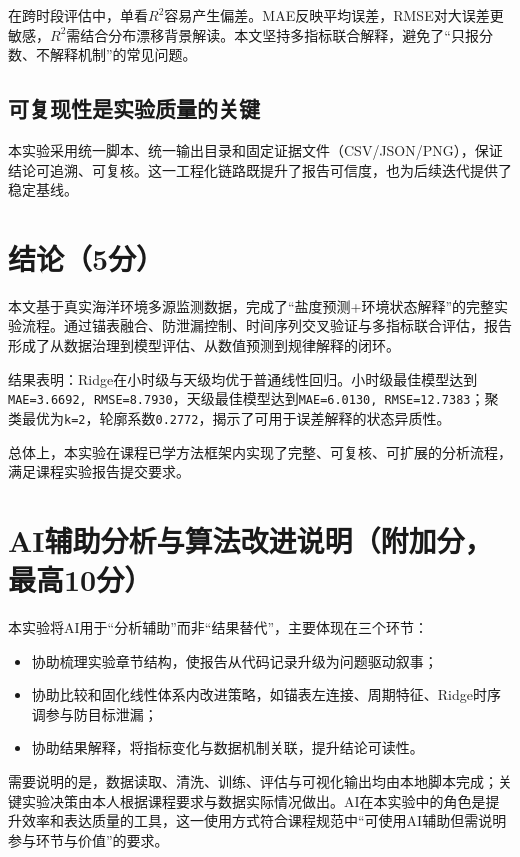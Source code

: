 在跨时段评估中，单看$R^2$容易产生偏差。MAE反映平均误差，RMSE对大误差更敏感，$R^2$需结合分布漂移背景解读。本文坚持多指标联合解释，避免了“只报分数、不解释机制”的常见问题。

\subsection{可复现性是实验质量的关键}

本实验采用统一脚本、统一输出目录和固定证据文件（CSV/JSON/PNG），保证结论可追溯、可复核。这一工程化链路既提升了报告可信度，也为后续迭代提供了稳定基线。

\section{结论（5分）}

本文基于真实海洋环境多源监测数据，完成了“盐度预测+环境状态解释”的完整实验流程。通过锚表融合、防泄漏控制、时间序列交叉验证与多指标联合评估，报告形成了从数据治理到模型评估、从数值预测到规律解释的闭环。

结果表明：Ridge在小时级与天级均优于普通线性回归。小时级最佳模型达到\texttt{MAE=3.6692, RMSE=8.7930}，天级最佳模型达到\texttt{MAE=6.0130, RMSE=12.7383}；聚类最优为\texttt{k=2}，轮廓系数\texttt{0.2772}，揭示了可用于误差解释的状态异质性。

总体上，本实验在课程已学方法框架内实现了完整、可复核、可扩展的分析流程，满足课程实验报告提交要求。

\section{AI辅助分析与算法改进说明（附加分，最高10分）}

本实验将AI用于“分析辅助”而非“结果替代”，主要体现在三个环节：
\begin{itemize}
    \item 协助梳理实验章节结构，使报告从代码记录升级为问题驱动叙事；
    \item 协助比较和固化线性体系内改进策略，如锚表左连接、周期特征、Ridge时序调参与防目标泄漏；
    \item 协助结果解释，将指标变化与数据机制关联，提升结论可读性。
\end{itemize}

需要说明的是，数据读取、清洗、训练、评估与可视化输出均由本地脚本完成；关键实验决策由本人根据课程要求与数据实际情况做出。AI在本实验中的角色是提升效率和表达质量的工具，这一使用方式符合课程规范中“可使用AI辅助但需说明参与环节与价值”的要求\cite{rubric_2025}。
